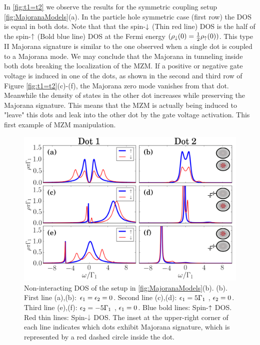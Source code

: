 In \ref{fig:t1=t2} we observe the results for the symmetric coupling setup \ref{fig:MajoranaModels}(a). In the particle hole symmetric case (first row) the DOS is equal in both dots. Note that that the spin-$\downarrow$ (Thin red line) DOS is the half of the spin-$\uparrow$ (Bold blue line) DOS at the Fermi energy $(\rho_\downarrow(0) = \frac{1}{2}\rho_\uparrow(0))$. This type II Majorana signature is similar to the one observed when a single dot is coupled to a Majorana mode. \cite{liu_detecting_2011} We may conclude that the Majorana in tunneling inside both dots breaking the localization of the MZM. If a positive or negative gate voltage is induced in one of the dots, as shown in the second and third row of Figure \ref{fig:t1=t2}(c)-(f),  the Majorana zero mode vanishes from that dot. Meanwhile the density of states in the other dot increases while preserving the Majorana signature. This means that the MZM is actually being induced to "leave" this dots and leak into the other dot by the gate voltage activation. This first example of MZM manipulation. 


\begin{figure}[bt]
    \begin{center}
    \includegraphics[scale=0.36]{IMAGES/GreenResults/t1>0.png}
    \caption{  \label{fig:t1>0} Non-interacting DOS of the setup in \ref{fig:MajoranaModels}(b). (b). First line (a),(b): $\epsilon_1=\epsilon_2=0$. Second line (c),(d): $\epsilon_1=5\Gamma_1$ , $\epsilon_2=0$. Third line (e),(f): $\epsilon_2=-5\Gamma_1$ , $\epsilon_1=0$.   Blue bold lines: Spin-$\uparrow$ DOS. Red thin lines: Spin-$\downarrow$ DOS. The inset at the upper-right corner of each line indicates which dots  exhibit  Majorana signature, which is represented by a red dashed circle inside the dot. \protect{}
    }
    \end{center}
\end{figure}

